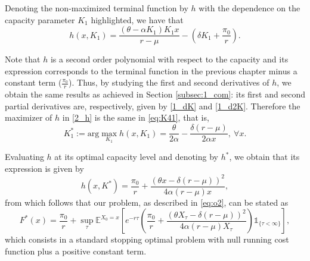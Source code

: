 Denoting the non-maximized terminal function by $h$ with the dependence on the capacity parameter $K_1$ highlighted, we have that
\begin{equation}
h(x,K_1)= \frac{(\theta-\alpha K_1)K_1 x}{r-\mu} - \left( \delta K_1  +\frac{\pi_0}{r}\right).
\label{2_h}
\end{equation}

Note that $h$ is a second order polynomial with respect to the capacity and its expression corresponds to the terminal function in the previous chapter minus a constant term ($\frac{\pi_0}{r}$). Thus, by studying the first and second derivatives of $h$, we obtain the same results as achieved in Section \ref{subsec:1_com}: its first and second partial derivatives are, respectively, given by \eqref{1_dK} and \eqref{1_d2K}. Therefore the maximizer of $h$ in \eqref{2_h} is the same in \eqref{eq:K41}, that is,
\begin{equation}
K^*_1:=\text{arg} \max_{K_1} h(x,K_1) = \frac{\theta}{2\alpha}-\frac{\delta (r-\mu)}{2 \alpha x}, \ \forall x.
\label{eq:Kopt2}
\end{equation}

Evaluating $h$ at its optimal capacity level and denoting by $h^*$, we obtain that its expression is given by
\begin{equation}
h(x,K^*)=\frac{\pi_0}{r} + \frac{(\theta x -\delta (r-\mu))^2}{4 \alpha (r-\mu) x}
,
\label{2_h*} 
\end{equation}
from which follows that our problem, as described in \eqref{eq:o2}, can be stated as
\begin{equation}
F^*(x)=\frac{\pi_0}{r}+ \sup _\tau \mathds{E}^{X_0=x} \left[ e^{-r\tau}   \left( \frac{\pi_0}{r} + \frac{(\theta X_\tau -\delta (r-\mu))^2}{4 \alpha (r-\mu) X_\tau} \right) \mathds{1}_{ \{\tau < \infty \} } \right],
\label{eq:opt22}
\end{equation}
which consists in a standard stopping optimal problem with null running cost function plus a positive constant term.


